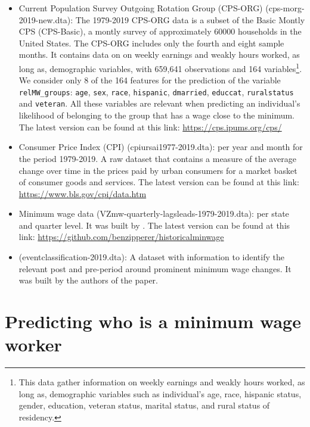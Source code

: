 \documentclass[11pt, a4paper, leqno]{article}
\begin{document}
\begin{itemize}
    \item Current Population Survey Outgoing Rotation Group (CPS-ORG) (cps-morg-2019-new.dta): The 1979-2019 
    CPS-ORG data is a subset of the Basic Montly CPS (CPS-Basic), a montly survey of approximately 60000 households in the United
    States. The CPS-ORG includes only the fourth and eight sample months. It contains data on on weekly earnings 
    and weakly hours worked, as long as, demographic variables, with 659,641 observations and 164 variables\footnote{This 
    data gather information on weekly earnings and weakly hours worked, as long as, demographic variables 
    such as individual's age, race, hispanic status, gender, education, veteran status, marital status, 
    and rural status of residency.}. We consider only 8 of the 164 features for the prediction of the variable
    \texttt{relMW\_groups}: \texttt{age}, \texttt{sex}, \texttt{race}, \texttt{hispanic},
    \texttt{dmarried}, \texttt{educcat}, \texttt{ruralstatus} and \texttt{veteran}. 
    All these variables are relevant when predicting an individual's 
    likelihood of belonging to the group that has a wage close to the minimum. 
    The latest version can be found at this link: \url{https://cps.ipums.org/cps/}
    \item Consumer Price Index (CPI) (cpiursai1977-2019.dta): per year and month for the period 1979-2019. 
    A raw dataset that contains a measure of the average change over time in the prices paid by 
    urban consumers for a market basket of consumer goods and services. 
    The latest version can be found at this link: \url{https://www.bls.gov/cpi/data.htm}
    \item Minimum wage data (VZmw-quarterly-lagsleads-1979-2019.dta):  per state and quarter level. 
    It was built by \citet{vaghul2016historical}.
    The latest version can be found at this link: \url{https://github.com/benzipperer/historicalminwage}
    \item (eventclassification-2019.dta): A dataset with information 
    to identify the relevant post and pre-period around prominent minimum wage changes. It was built by
    the authors of the paper.
\end{itemize}

\section{Predicting who is a minimum wage worker} %
\label{sec:prediction}
\end{document}
